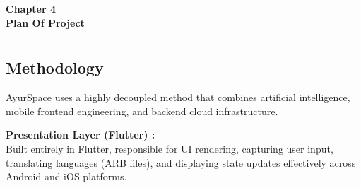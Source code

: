 
\newpage
\vspace*{\fill}
\begin{center}
\textbf{\Huge{Chapter 4}}\\
\vspace{5mm}
\textbf{\Huge{Plan Of Project}}
\end{center}
\vspace*{\fill}
\newpage

\titleformat{\chapter}[block]{\normalfont}{}{0pt}{}
\titlespacing{\chapter}{0pt}{-2em}{0pt}
\chapter[Plan Of Project]{}
\thispagestyle{fancy}
\titleformat{\chapter}[display]{\vspace{1cm}\normalfont\Large\bfseries\centering}{\chaptertitlename\ \thechapter}{20pt}{\vspace{0pt}}
\titlespacing*{\chapter}{0pt}{-50pt}{20pt}

\section{Methodology}
\justify

AyurSpace uses a highly decoupled method that combines artificial intelligence, mobile frontend engineering, and backend cloud infrastructure.

\item[$\bullet$]\textbf{ Presentation Layer (Flutter) :}\\ Built entirely in Flutter, responsible for UI rendering, capturing user input, translating languages (ARB files), and displaying state updates effectively across Android and iOS platforms.


